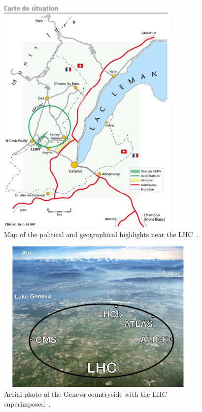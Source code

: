 \begin{figure}[htbp!]
 \begin{center}
    \includegraphics[width=0.80\textwidth]{figures/experiment/lhc-pho-1997-169.jpg}
      \end{center}
\caption{Map of the political and geographical highlights near the LHC~\cite{Dailler:842399}.}
\label{fig:lhc_mapwithcities}
\end{figure}

\begin{figure}[htbp!]
 \begin{center}
    \includegraphics[width=0.90\textwidth]{figures/experiment/lhc-switzerland.pdf}
      \end{center}
\caption{Aerial photo of the Geneva countryside with the LHC superimposed~\cite{Tuna:thesis}.}
\label{fig:lhc_map_tuna}
\end{figure}

